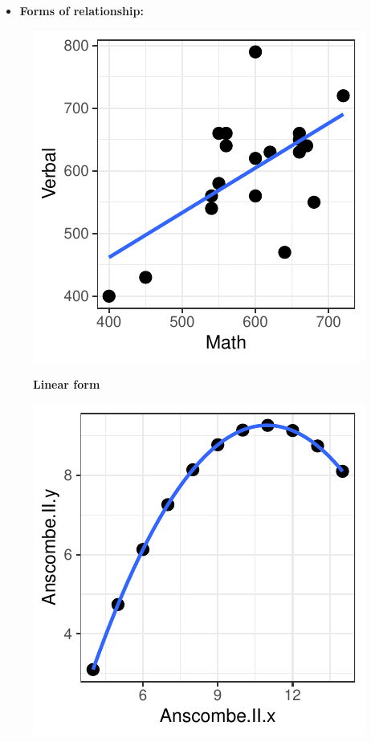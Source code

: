 \begin{itemize}
  \item \textbf{Forms of relationship:}
\end{itemize}
\begin{minipage}{1.2\textwidth}
    \begin{minipage}[t]{0.3\textwidth}
      \begin{figure}[H]
        \begin{center}
          \includegraphics[scale=0.4]{figure-latex/unnamed-chunk-4-4-1}
          
          \textbf{Linear form}
        \end{center}
      \end{figure}
    \end{minipage}
    \begin{minipage}[t]{0.3\textwidth}
      \begin{figure}[H]
        \begin{center}
          \includegraphics[scale=0.4]{figure-latex/unnamed-chunk-4-5-1}
          

\end{center}
\end{figure}
\end{minipage}
\end{minipage}
